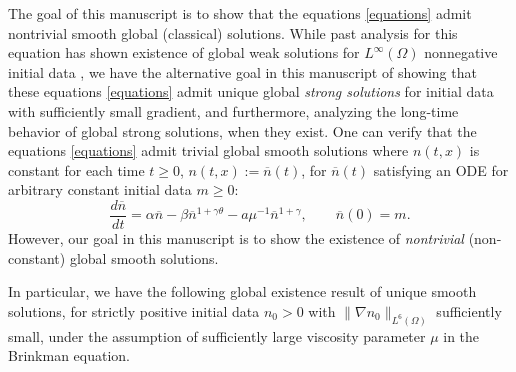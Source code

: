 \documentclass[12pt]{article}
\theoremstyle{plain}
\begin{document}
The goal of this manuscript is to show that the equations \eqref{equations} admit nontrivial smooth global (classical) solutions. While past analysis for this equation has shown existence of global weak solutions for $L^{\infty}(\Omega)$ nonnegative initial data \cite{WeberTrivisa, TrivisaWeberDrug}, we have the alternative goal in this manuscript of showing that these equations \eqref{equations} admit unique global \textit{strong solutions} for initial data with sufficiently small gradient, and furthermore, analyzing the long-time behavior of global strong solutions, when they exist. One can verify that the equations \eqref{equations} admit trivial global smooth solutions where $n(t, x)$ is constant for each time $t \ge 0$, $n(t, x) := \overline{n}(t)$, for $\overline{n}(t)$ satisfying an ODE for arbitrary constant initial data $m \ge 0$:
\begin{equation*}
\frac{d\overline{n}}{dt} = \alpha \overline{n} - \beta \overline{n}^{1 + \gamma \theta} - a\mu^{-1}\overline{n}^{1 + \gamma}, \qquad \overline{n}(0) = m.
\end{equation*}
However, our goal in this manuscript is to show the existence of \textit{nontrivial} (non-constant) global smooth solutions.

In particular, we have the following global existence result of unique smooth solutions, for strictly positive initial data $n_{0} > 0$ with $\|\nabla n_{0}\|_{L^{6}(\Omega)}$ sufficiently small, under the assumption of sufficiently large viscosity parameter $\mu$ in the Brinkman equation.
\end{document}

